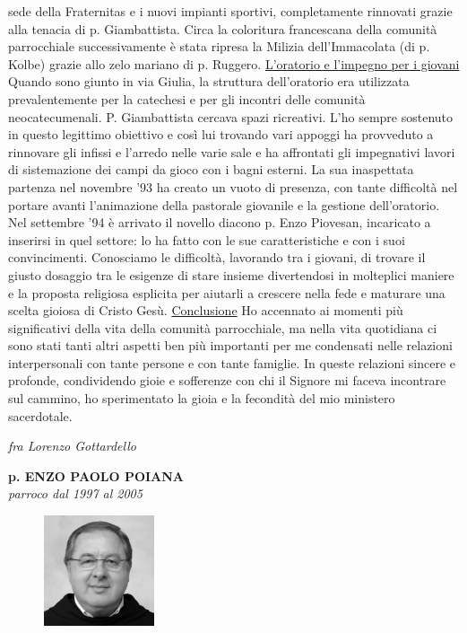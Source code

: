 sede della Fraternitas e i nuovi impianti sportivi, completamente rinnovati grazie alla tenacia di p. 
Giambattista. 
Circa la coloritura francescana della comunità parrocchiale successivamente è stata ripresa la 
Milizia dell’Immacolata (di p. Kolbe) grazie allo zelo mariano di p. Ruggero. 
\bigbreak
{}
\noindent \underline{L'oratorio e l'impegno per i giovani}
\medbreak
\noindent Quando sono giunto in via Giulia, la struttura dell'oratorio era utilizzata prevalentemente per 
la catechesi e per gli incontri delle comunità neocatecumenali. P. Giambattista cercava spazi 
ricreativi. L'ho sempre sostenuto in questo legittimo obiettivo e così lui trovando vari appoggi ha 
provveduto a rinnovare gli infissi e l'arredo nelle varie sale e ha affrontati gli impegnativi lavori di 
sistemazione dei campi da gioco con i bagni esterni.
La sua inaspettata partenza nel novembre '93 ha creato un vuoto di presenza, con tante 
difficoltà nel portare avanti l'animazione della pastorale giovanile e la gestione dell'oratorio.
Nel settembre '94 è arrivato il novello diacono p. Enzo Piovesan, incaricato a inserirsi in quel 
settore: lo ha fatto con le sue caratteristiche e con i suoi convincimenti. Conosciamo le difficoltà, 
lavorando tra i giovani, di trovare il giusto dosaggio tra le esigenze di stare insieme divertendosi in 
molteplici maniere e la proposta religiosa esplicita per aiutarli a crescere nella fede e maturare una 
scelta gioiosa di Cristo Gesù.
\bigbreak
{}
\noindent \underline{Conclusione}
\medbreak
\noindent Ho accennato ai momenti più significativi della vita della comunità parrocchiale, ma nella 
vita quotidiana ci sono stati tanti altri aspetti ben più importanti per me condensati nelle relazioni 
interpersonali con tante persone e con tante famiglie. In queste relazioni sincere e profonde, 
condividendo gioie e sofferenze con chi il Signore mi faceva incontrare sul cammino, ho 
sperimentato la gioia e la fecondità del mio ministero sacerdotale. 
\begin{flushright}
\textit{fra Lorenzo Gottardello}
\end{flushright}
\endgroup
\newpage
\begin{center}
\textbf{\Large p. ENZO PAOLO POIANA}\\
	\textit{parroco dal 1997 al 2005}
\end{center}
\bigbreak
\begingroup
\setlength\intextsep{0pt}
\begin{figure}
\centering
\includegraphics[width=0.29\textwidth]{immagini/enzo.jpg}
\end{figure}
